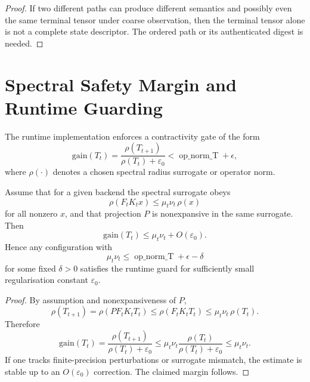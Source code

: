 \documentclass[12pt,a4paper]{article}
\theoremstyle{definition}
\theoremstyle{plain}
\theoremstyle{remark}
\begin{document}
\begin{proof}
If two different paths can produce different semantics and possibly even the same
terminal tensor under coarse observation, then the terminal tensor alone is not a
complete state descriptor. The ordered path or its authenticated digest is needed.
\end{proof}

\section{Spectral Safety Margin and Runtime Guarding}

The runtime implementation enforces a contractivity gate of the form
\begin{equation}
\mathrm{gain}(T_t) = \frac{\rho(T_{t+1})}{\rho(T_t)+\varepsilon_0}
< \operatorname{op\_norm\_T} + \epsilon,
\end{equation}
where $\rho(\cdot)$ denotes a chosen spectral radius surrogate or operator norm.

\begin{proposition}
Assume that for a given backend the spectral surrogate obeys
\begin{equation}
\rho(F_tK_t x) \le \mu_t\nu_t\,\rho(x)
\end{equation}
for all nonzero $x$, and that projection $P$ is nonexpansive in the same
surrogate. Then
\begin{equation}
\mathrm{gain}(T_t) \le \mu_t\nu_t + O(\varepsilon_0).
\end{equation}
Hence any configuration with
\begin{equation}
\mu_t\nu_t \le \operatorname{op\_norm\_T} + \epsilon - \delta
\end{equation}
for some fixed $\delta>0$ satisfies the runtime guard for sufficiently small
regularisation constant $\varepsilon_0$.
\end{proposition}

\begin{proof}
By assumption and nonexpansiveness of $P$,
\begin{equation}
\rho(T_{t+1}) = \rho(PF_tK_tT_t) \le \rho(F_tK_tT_t)
\le \mu_t\nu_t\,\rho(T_t).
\end{equation}
Therefore
\begin{equation}
\mathrm{gain}(T_t) = \frac{\rho(T_{t+1})}{\rho(T_t)+\varepsilon_0}
\le \mu_t\nu_t\frac{\rho(T_t)}{\rho(T_t)+\varepsilon_0}
\le \mu_t\nu_t.
\end{equation}
If one tracks finite-precision perturbations or surrogate mismatch, the estimate
is stable up to an $O(\varepsilon_0)$ correction. The claimed margin follows.
\end{proof}
\end{document}
